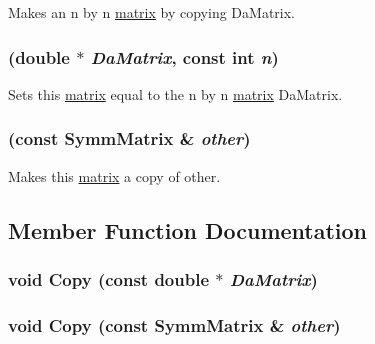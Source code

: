 Makes an n by n \hyperlink{classJKBuilder_1_1matrix}{matrix} by copying DaMatrix. \hypertarget{classJKBuilder_1_1SymmMatrix_a485694eb867a2f935521aa7cc869dd25}{
\subsubsection[{SymmMatrix}]{ (double $\ast$ {\em DaMatrix}, \/  const int {\em n})}}
\label{classJKBuilder_1_1SymmMatrix_a485694eb867a2f935521aa7cc869dd25}


Sets this \hyperlink{classJKBuilder_1_1matrix}{matrix} equal to the n by n \hyperlink{classJKBuilder_1_1matrix}{matrix} DaMatrix. \hypertarget{classJKBuilder_1_1SymmMatrix_aee15e64745fb95965ac5a526a70a7330}{
\subsubsection[{SymmMatrix}]{ (const {\bf SymmMatrix} \& {\em other})}}
\label{classJKBuilder_1_1SymmMatrix_aee15e64745fb95965ac5a526a70a7330}


Makes this \hyperlink{classJKBuilder_1_1matrix}{matrix} a copy of other. 

\subsection{Member Function Documentation}
\hypertarget{classJKBuilder_1_1SymmMatrix_aa9f626f684be5ba6ce49b6a335c2e5fe}{
\subsubsection[{Copy}]{\setlength{\rightskip}{0pt plus 5cm}void Copy (const double $\ast$ {\em DaMatrix})}}
\label{classJKBuilder_1_1SymmMatrix_aa9f626f684be5ba6ce49b6a335c2e5fe}
\hypertarget{classJKBuilder_1_1SymmMatrix_a7be0365900350f51e54969bb1961af8f}{
\subsubsection[{Copy}]{\setlength{\rightskip}{0pt plus 5cm}void Copy (const {\bf SymmMatrix} \& {\em other})}}
\label{classJKBuilder_1_1SymmMatrix_a7be0365900350f51e54969bb1961af8f}


